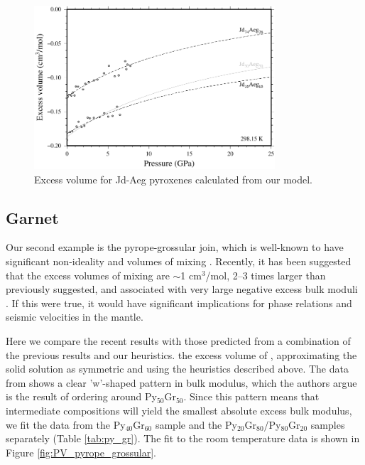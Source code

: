 \documentclass[review]{elsarticle}
\begin{document}
\begin{figure}[ht!]
  \centering
  \includegraphics[width=0.8\textwidth]{figures/jadeite_aegirine_Vex}
  \caption{Excess volume for Jd-Aeg pyroxenes calculated from our model.}
  \label{fig:excess_volume_jadeite_aegirine}
\end{figure}

\clearpage
\subsection{Garnet}
Our second example is the pyrope-grossular join, which is well-known to have significant non-ideality and volumes of mixing \citep{NCK1977, BG1997, GCT1996}. Recently, it has been suggested that the excess volumes of mixing are $\sim$1 cm$^3$/mol, 2--3 times larger than previously suggested, and associated with very large negative excess bulk moduli \citep{DCW2015}. If this were true, it would have significant implications for phase relations and seismic velocities in the mantle.

Here we compare the recent results with those predicted from a combination of the previous results and our heuristics. the excess volume of \cite{DCW2015}, approximating the solid solution as symmetric and using the heuristics described above. The data from \cite{DCW2015} shows a clear 'w'-shaped pattern in bulk modulus, which the authors argue is the result of ordering around Py$_{50}$Gr$_{50}$. Since this pattern means that intermediate compositions will yield the smallest absolute excess bulk modulus, we fit the data from the Py$_{40}$Gr$_{60}$ sample and the Py$_{20}$Gr$_{80}$/Py$_{80}$Gr$_{20}$ samples separately (Table \ref{tab:py_gr}). The fit to the room temperature data is shown in Figure \ref{fig:PV_pyrope_grossular}.
\end{document}
